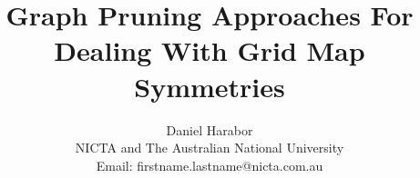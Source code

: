 \documentclass{article}
\begin{document}
\title{Graph Pruning Approaches For Dealing With Grid Map Symmetries}
\author{Daniel Harabor \\ 
NICTA and The Australian National University \\
Email: firstname.lastname@nicta.com.au
}

\maketitle



%





\end{document}
